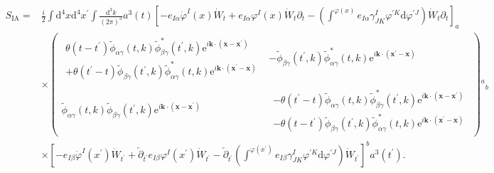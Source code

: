 \documentclass[aps, prd
, preprint
, nofootinbib 
]{revtex4-1}
\newcommand{\dd}{\mathrm{d}}
\newcommand{\ee}{\mathrm{e}}
\newcommand{\dk}{\frac{\dd^3k}{(2\pi)^3}}
\newcommand{\bae}[1]{\begin{align} #1 \end{align}}
\newcommand{\bpme}[1]{\begin{pmatrix} #1 \end{pmatrix}}
\begin{document}
\bae{
	S_\text{IA}=&\frac{i}{2}\int\dd^4x\dd^4x^\prime\int\dk a^3(t)\left[-e_{I\alpha}\dot{\varphi}^I(x)\dot{W}_t+e_{I\alpha}\varphi^I(x)\dot{W}_t\partial_t
	-\left(\int^{\varphi(x)}e_{I\alpha}\gamma^I_{JK}\varphi^{\prime K}\dd\varphi^{\prime J}\right)\dot{W}_t\partial_t\right]_a \nonumber \\
	&\times\bpme{
		\begin{array}{c}
			\theta(t-t^\prime)\tilde{\phi}_{\alpha\gamma}(t,k)\tilde{\phi}_{\beta\gamma}^*(t^\prime,k)
			\ee^{i\mathbf{k}\cdot(\mathbf{x}-\mathbf{x}^\prime)} \\
			+\theta(t^\prime-t)\tilde{\phi}_{\beta\gamma}(t^\prime,k)\tilde{\phi}_{\alpha\gamma}^*(t,k)
			\ee^{i\mathbf{k}\cdot(\mathbf{x}^\prime-\mathbf{x})}
		\end{array}
		& -\tilde{\phi}_{\beta\gamma}(t^\prime,k)\tilde{\phi}_{\alpha\gamma}^*(t,k)\ee^{i\mathbf{k}\cdot(\mathbf{x}^\prime-\mathbf{x})} \\
		\tilde{\phi}_{\alpha\gamma}(t,k)\tilde{\phi}_{\beta\gamma}(t^\prime,k)\ee^{i\mathbf{k}\cdot(\mathbf{x}-\mathbf{x}^\prime)} &
		\begin{array}{c}
			-\theta(t^\prime-t)\tilde{\phi}_{\alpha\gamma}(t,k)\tilde{\phi}_{\beta\gamma}^*(t^\prime,k)
			\ee^{i\mathbf{k}\cdot(\mathbf{x}-\mathbf{x}^\prime)} \\
			-\theta(t-t^\prime)\tilde{\phi}_{\beta\gamma}(t^\prime,k)\tilde{\phi}_{\alpha\gamma}^*(t,k)
			\ee^{i\mathbf{k}\cdot(\mathbf{x}^\prime-\mathbf{x})}
		\end{array}
	}{}^a{}_b \nonumber \\
	&\times\left[-e_{I\beta}\dot{\varphi}^I(x^\prime)\dot{W}_{t^\prime}
	+\overleftarrow{\partial}_{t^\prime}e_{I\beta}\varphi^I(x^\prime)\dot{W}_{t^\prime}
	-\overleftarrow{\partial}_{t^\prime}\left(\int^{\varphi(x^\prime)}e_{I\beta}\gamma^I_{JK}\varphi^{\prime K}\dd\varphi^{\prime J}\right)
	\dot{W}_{t^\prime}\right]^ba^3(t^\prime).
}
\end{document}

